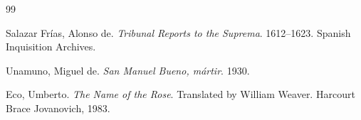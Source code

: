 \documentclass[12pt]{article}
\begin{document}
\newpage

\begin{thebibliography}{99}

Salazar Fr\'ias, Alonso de. \textit{Tribunal Reports to the Suprema}. 1612--1623. Spanish Inquisition Archives.

Unamuno, Miguel de. \textit{San Manuel Bueno, m\'artir}. 1930.

Eco, Umberto. \textit{The Name of the Rose}. Translated by William Weaver. Harcourt Brace Jovanovich, 1983.

\end{thebibliography}
\end{document}

